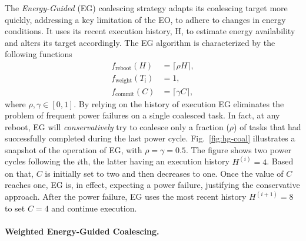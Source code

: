 The \emph{Energy-Guided} (EG) coalescing strategy adapts its coalescing target more quickly, addressing a key limitation of the EO, to adhere to changes in energy conditions. It uses its recent execution history, H, to estimate energy availability and alters its target accordingly. The EG algorithm is characterized by the following functions
%
\begin{equation}
	\begin{split}
		 f_\text{reboot}(H) & = \lceil \rho H \rceil,\\
		 f_\text{weight}(T_\text{i}) & = 1, \\
		 f_\text{commit}(C) & = \lceil \gamma C \rceil,
	\end{split}
	\label{eq:eg}
\end{equation}
%
where $\rho, \gamma \in [0, 1]$. By relying on the history of execution EG eliminates the problem of frequent power failures on a single coalesced task. In fact, at any reboot, EG will {\em conservatively} try to coalesce only a fraction ($\rho$) of tasks that had successfully completed during the last power cycle.
Fig.~\ref{fig:hg-coal} illustrates a snapshot of the operation of EG, with $\rho = \gamma = 0.5$. The figure shows two power cycles following the $i$th, the latter having an execution history $H^{(i)} = 4$. Based on that, $C$ is initially set to two and then decreases to one. Once the value of $C$ reaches one, EG is, in effect, expecting a power failure, justifying the conservative approach. After the power failure, EG uses the most recent history $H^{(i+1)} = 8$ to set $C = 4$ and continue execution.

\paragraph{Weighted Energy-Guided Coalescing.}
\label{subsec:energyTaskAware}


